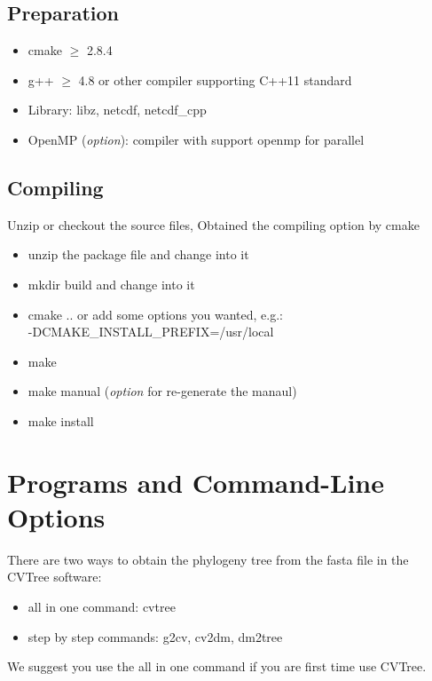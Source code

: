 \documentclass[a4paper,12pt]{article}
\begin{document}
\subsection{Preparation}
\begin{itemize}
	\item cmake $\geq$ 2.8.4
	\item g++ $\geq$ 4.8 or other compiler supporting C++11 standard
	\item Library: libz, netcdf, netcdf\_cpp
	\item OpenMP ({\it option}): compiler with support openmp for parallel
\end{itemize}

\subsection{Compiling}
Unzip or checkout the source files, Obtained the compiling option by
cmake
\begin{itemize}
	\item unzip the package file and change into it
	\item mkdir build and change into it
	\item cmake .. or add some options you wanted, e.g.:\\ -DCMAKE\_INSTALL\_PREFIX=/usr/local
	\item make
	\item make manual ({\it option} for re-generate the manaul)
	\item make install
\end{itemize}

\section{Programs and Command-Line Options}
There are two ways to obtain the phylogeny tree from the fasta file in the CVTree
software:
\begin{itemize}
	\item all in one command: cvtree
	\item step by step commands: g2cv, cv2dm, dm2tree
\end{itemize}
We suggest you use the all in one command if you are first time use CVTree.

\vspace{1em}
\noindent{}
\end{document}
